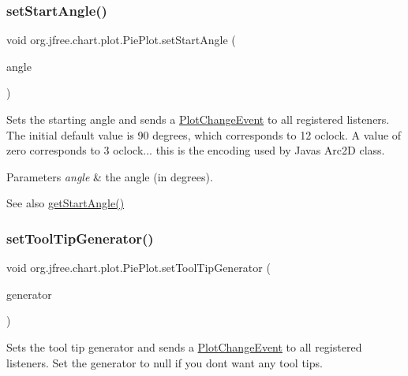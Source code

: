 \subsubsection{\texorpdfstring{set\+Start\+Angle()}{setStartAngle()}}
{\footnotesize\ttfamily void org.\+jfree.\+chart.\+plot.\+Pie\+Plot.\+set\+Start\+Angle (\begin{DoxyParamCaption}\item[{double}]{angle }\end{DoxyParamCaption})}

Sets the starting angle and sends a \mbox{\hyperlink{}{Plot\+Change\+Event}} to all registered listeners. The initial default value is 90 degrees, which corresponds to 12 o\textquotesingle{}clock. A value of zero corresponds to 3 o\textquotesingle{}clock... this is the encoding used by Java\textquotesingle{}s Arc2D class.


\begin{DoxyParams}{Parameters}
{\em angle} & the angle (in degrees).\\
\hline
\end{DoxyParams}
\begin{DoxySeeAlso}{See also}
\mbox{\hyperlink{classorg_1_1jfree_1_1chart_1_1plot_1_1_pie_plot_a71e04a3186bbc4c22788ae6a04853734}{get\+Start\+Angle()}} 
\end{DoxySeeAlso}
\mbox{\label{classorg_1_1jfree_1_1chart_1_1plot_1_1_pie_plot_ad520cee8df753e527fc1e1376780de84}} 
\subsubsection{\texorpdfstring{set\+Tool\+Tip\+Generator()}{setToolTipGenerator()}}
{\footnotesize\ttfamily void org.\+jfree.\+chart.\+plot.\+Pie\+Plot.\+set\+Tool\+Tip\+Generator (\begin{DoxyParamCaption}\item[{\mbox{\hyperlink{interfaceorg_1_1jfree_1_1chart_1_1labels_1_1_pie_tool_tip_generator}{Pie\+Tool\+Tip\+Generator}}}]{generator }\end{DoxyParamCaption})}

Sets the tool tip generator and sends a \mbox{\hyperlink{}{Plot\+Change\+Event}} to all registered listeners. Set the generator to {\ttfamily null} if you don\textquotesingle{}t want any tool tips.


